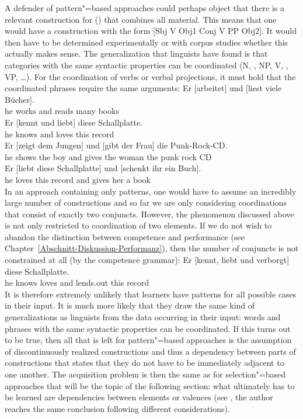 \largerpage
A defender of pattern"=based approaches could perhaps object that there is a relevant construction for () that combines
all material. This means that one would have a construction with the form [Sbj V Obj1 Conj V PP Obj2].
It would then have to be determined experimentally or with corpus studies whether this actually makes sense.
The generalization that linguists have found is that categories with the same syntactic properties can be coordinated 
(N, \nbar, NP, V, \vbar, VP, \ldots). For the coordination of verbs or verbal projections, it must hold that the coordinated
phrases require the same arguments:
\eal
\ex 
\gll Er [arbeitet] und [liest viele Bücher].\\
     he \spacebr{}works and \spacebr{}reads many books\\
\ex 
\gll Er [kennt und liebt] diese Schallplatte.\\
     he \spacebr{}knows and loves this record\\
\ex 
\gll Er [zeigt dem Jungen] und [gibt der Frau] die Punk-Rock-CD.\\
     he \spacebr{}shows the boy and \spacebr{}gives the woman the {punk rock CD}\\
\ex 
\gll Er [liebt diese Schallplatte] und [schenkt ihr ein Buch].\\
     he \spacebr{}loves this record and \spacebr{}gives her a book\\
\zl
In an approach containing only patterns, one would have to assume an incredibly large number of constructions and so far we are
only considering coordinations that consist of exactly two conjuncts. However, the phenomenon discussed above is not only restricted
to coordination of two elements. If we do not wish to abandon the distinction between competence and performance
(see Chapter~\ref{Abschnitt-Diskussion-Performanz}), then the number of conjuncts is not constrained at all (by the competence grammar):
\ea
\gll Er [kennt, liebt und verborgt] diese Schallplatte.\\
	 he \spacebr{}knows loves and lends.out this record\\
\z
It is therefore extremely unlikely that learners have patterns for all possible cases in their input. It is much more likely that they draw
the same kind of generalizations as linguists from the data occurring in their input: words and phrases with the same syntactic
properties can be coordinated. 
If this turns out to be true, then all that is left for pattern"=based approaches is the assumption of discontinuously realized constructions
and thus a dependency between parts of constructions that states that they do not have to be immediately adjacent to one another.
The acquisition problem is then the same as for selection"=based approaches that will be the topic of the following section: what ultimately has
to be learned are dependencies between elements or valences (see , the author reaches the same conclusion
following different considerations).%
\indexcxgend

